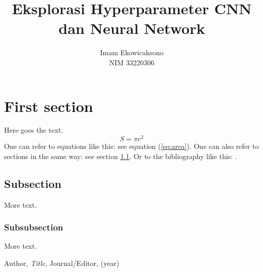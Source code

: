 \documentclass{article}
\title{Eksplorasi Hyperparameter CNN dan Neural Network}
\author{Imam Ekowicaksono\\
  \small NIM 33220306
}
\theoremstyle{definition}
\theoremstyle{remark}
\begin{document}
\maketitle


\section{First section}

Here goes the text.
\begin{equation}\label{eq:area}
  S = \pi r^2
\end{equation}
One can refer to equations like this: see equation (\ref{eq:area}). One can also
refer to sections in the same way: see section \ref{sec:nothing}. Or
to the bibliography like this: \cite{Cd94}.

\subsection{Subsection}\label{sec:nothing}

More text.

\subsubsection{Subsubsection}\label{sec:nothing2}

More text.

\begin{thebibliography}{99}

 Author, \emph{Title}, Journal/Editor, (year)

\end{thebibliography}
\end{document}
